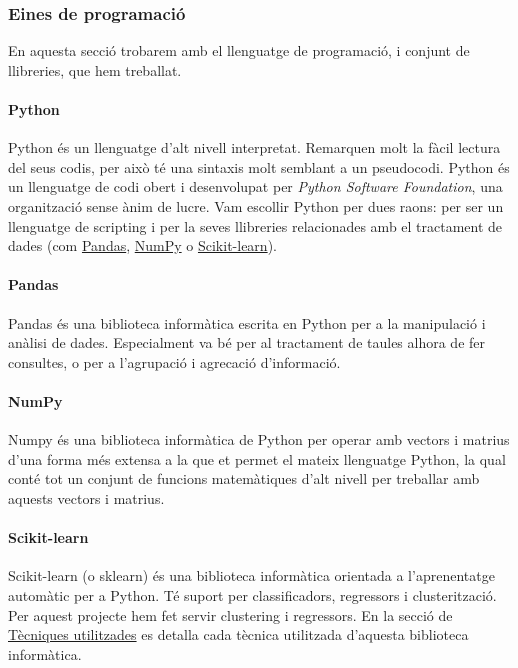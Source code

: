 \documentclass[12pt,a4paper,catalan]{article}
\begin{document}
\newpage
\subsubsection{Eines de programació}
En aquesta secció trobarem amb el llenguatge de programació, i conjunt de llibreries, que hem treballat.

\paragraph{Python}
Python \cite{python} és un llenguatge d'alt nivell interpretat. Remarquen molt la fàcil lectura del seus codis, per això té una sintaxis molt semblant a un pseudocodi. Python és un llenguatge de codi obert i desenvolupat per \textit{Python Software Foundation}, una organització sense ànim de lucre. Vam escollir Python per dues raons: per ser un llenguatge de scripting i per la seves llibreries relacionades amb el tractament de dades (com \hyperlink{pandas}{Pandas}, \hyperlink{numpy}{NumPy} o \hyperlink{sklearn}{Scikit-learn}).


\hypertarget{pandas}{
	\paragraph{Pandas}
}
Pandas \cite{pandas} és una biblioteca informàtica escrita en Python per a la manipulació i anàlisi de dades. Especialment va bé per al tractament de taules alhora de fer consultes, o per a l'agrupació i agrecació d'informació.

\hypertarget{numpy}{
	\paragraph{NumPy}
}
Numpy \cite{numpy} és una biblioteca informàtica de Python per operar amb vectors i matrius d'una forma més extensa a la que et permet el mateix llenguatge Python, la qual conté tot un conjunt de funcions matemàtiques d'alt nivell per treballar amb aquests vectors i matrius.

\hypertarget{sklearn}{
	\paragraph{Scikit-learn}
}
Scikit-learn \cite{sklearn} (o sklearn) és una biblioteca informàtica orientada a l'aprenentatge automàtic per a Python. Té suport per classificadors, regressors i clusterització. Per aquest projecte hem fet servir clustering i regressors. En la secció de \hyperlink{tecniquesutilitzades}{Tècniques utilitzades} es detalla cada tècnica utilitzada d'aquesta biblioteca informàtica.
\end{document}
